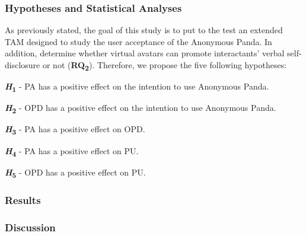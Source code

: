 \subsubsection{Hypotheses and Statistical Analyses}
As previously stated, the goal of this study is to put to the test an extended TAM designed to study the user acceptance of the Anonymous Panda. In addition, determine whether virtual avatars can promote interactants' verbal self-disclosure or not (\textbf{RQ\textsubscript{2}}). Therefore, we propose the five following hypotheses:

\textbf{\textit{H}\textsubscript{1}} - PA has a positive effect on the intention to use Anonymous Panda.

\textbf{\textit{H}\textsubscript{2}} - OPD has a positive effect on the intention to use Anonymous Panda.

\textbf{\textit{H}\textsubscript{3}} - PA has a positive effect on OPD.

\textbf{\textit{H}\textsubscript{4}} - PA has a positive effect on PU.

\textbf{\textit{H}\textsubscript{5}} - OPD has a positive effect on PU.

\subsubsection{Results}

\subsubsection{Discussion}
